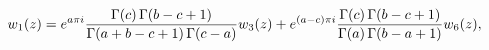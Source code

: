 \[w_{1}(z)=e^{a\pi i}\frac{\mathop{\Gamma\/}\nolimits\!\left(c\right)\mathop{%
\Gamma\/}\nolimits\!\left(b-c+1\right)}{\mathop{\Gamma\/}\nolimits\!\left(a+b-%
c+1\right)\mathop{\Gamma\/}\nolimits\!\left(c-a\right)}w_{3}(z)+e^{(a-c)\pi i}%
\frac{\mathop{\Gamma\/}\nolimits\!\left(c\right)\mathop{\Gamma\/}\nolimits\!%
\left(b-c+1\right)}{\mathop{\Gamma\/}\nolimits\!\left(a\right)\mathop{\Gamma\/%
}\nolimits\!\left(b-a+1\right)}w_{6}(z),\]